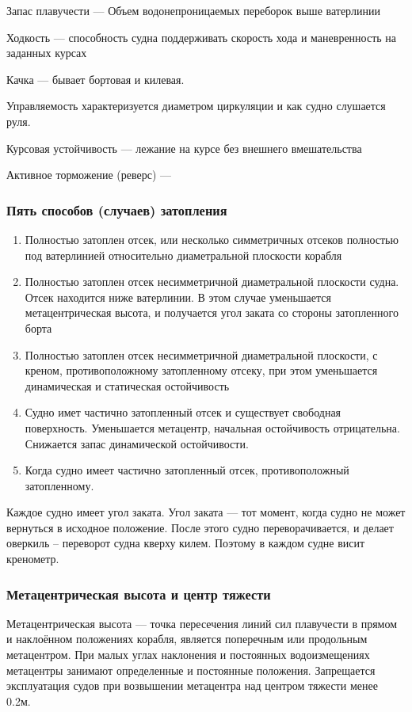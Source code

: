\documentclass{article}        %
\begin{document}
\begin{description}
Запас плавучести --- Объем водонепроницаемых переборок выше ватерлинии

Ходкость --- способность судна поддерживать скорость хода и маневренность на заданных курсах

Качка --- бывает бортовая и килевая.

Управляемость характеризуется диаметром циркуляции и как судно слушается руля.

Курсовая устойчивость --- лежание на курсе без внешнего вмешательства

Активное торможение (реверс) --- 

\subsubsection{Пять способов (случаев) затопления}
\begin{enumerate}
	\item Полностью затоплен отсек, или несколько симметричных отсеков полностью под ватерлинией относительно диаметральной плоскости корабля
	\item Полностью затоплен отсек несимметричной диаметральной плоскости судна. Отсек находится ниже ватерлинии. В этом случае уменьшается метацентрическая высота, и получается угол заката со стороны затопленного борта
	\item Полностью затоплен отсек несимметричной диаметральной плоскости, с креном, противоположному затопленному отсеку, при этом уменьшается динамическая и статическая остойчивость
	\item Судно имет частично затопленный отсек и существует свободная поверхность. Уменьшается метацентр, начальная остойчивость отрицательна. Снижается запас динамической остойчивости.
	\item Когда судно имеет частично затопленный отсек, противоположный затопленному.
\end{enumerate}

Каждое судно имеет угол заката. 
Угол заката --- тот момент, когда судно не может вернуться в исходное положение. После этого судно переворачивается, и делает оверкиль -- переворот судна кверху килем.
Поэтому в каждом судне висит кренометр.

\subsubsection{Метацентрическая высота и центр тяжести}
Метацентрическая высота --- точка пересечения линий сил плавучести в прямом и наклоённом положениях корабля, 
	является поперечным или продольным метацентром. При малых углах наклонения и постоянных водоизмещениях метацентры занимают определенные и постоянные положения. Запрещается эксплуатация судов при возвышении метацентра над центром тяжести менее 0.2м. 


\end{description}
\end{document}
